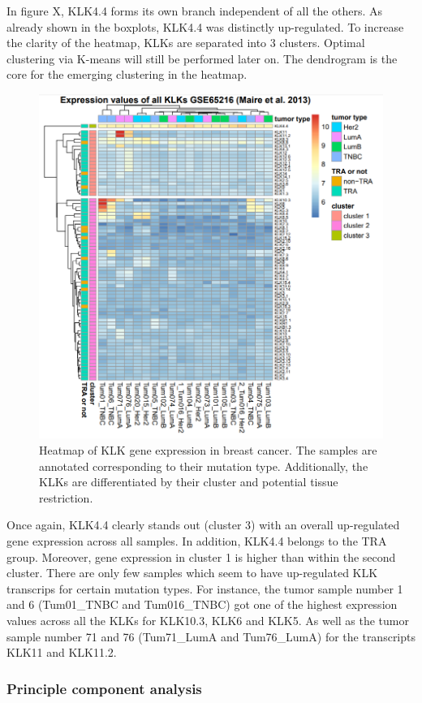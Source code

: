 \documentclass[
]{article}
\begin{document}
In figure X, KLK4.4 forms its own branch independent of all the others.
As already shown in the boxplots, KLK4.4 was distinctly up-regulated. To
increase the clarity of the heatmap, KLKs are separated into 3 clusters.
Optimal clustering via K-means will still be performed later on. The
dendrogram is the core for the emerging clustering in the heatmap.

\begin{figure}

{\centering \includegraphics[width=0.5\linewidth]{images/Heatmap_breast} 

}

\caption{Heatmap of KLK gene expression in breast cancer. The samples are annotated corresponding to their mutation type. Additionally, the KLKs are differentiated by their cluster and potential tissue restriction.}\label{fig:Heatmap - breast }
\end{figure}

Once again, KLK4.4 clearly stands out (cluster 3) with an overall
up-regulated gene expression across all samples. In addition, KLK4.4
belongs to the TRA group. Moreover, gene expression in cluster 1 is
higher than within the second cluster. There are only few samples which
seem to have up-regulated KLK transcrips for certain mutation types. For
instance, the tumor sample number 1 and 6 (Tum01\_TNBC and Tum016\_TNBC)
got one of the highest expression values across all the KLKs for
KLK10.3, KLK6 and KLK5. As well as the tumor sample number 71 and 76
(Tum71\_LumA and Tum76\_LumA) for the transcripts KLK11 and KLK11.2.

\hypertarget{principle-component-analysis}{%
\subsubsection{Principle component
analysis}\label{principle-component-analysis}}
\end{document}

